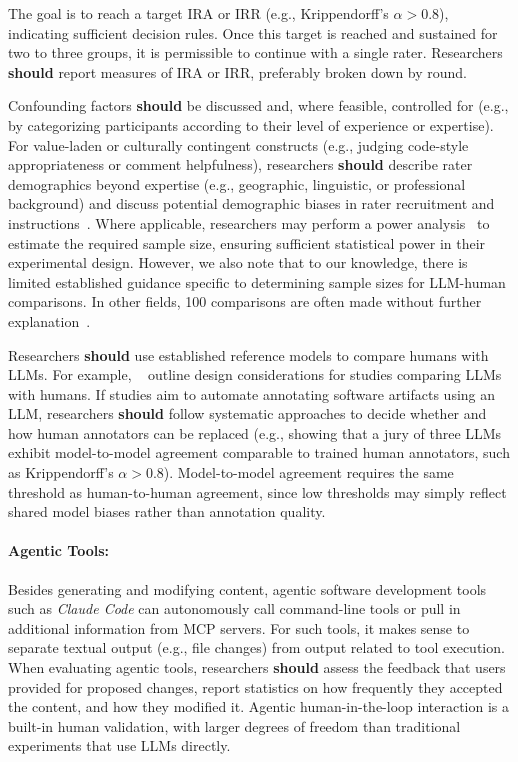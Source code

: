 \documentclass[smallextended]{svjour3}
\newcommand{\should}{\textbf{should}\xspace}
\begin{document}
The goal is to reach a target IRA or IRR (e.g., Krippendorff's $\alpha>0.8$), indicating sufficient decision rules. Once this target is reached and sustained for two to three groups, it is permissible to continue with a single rater.
Researchers \should report measures of IRA or IRR, preferably broken down by round.

Confounding factors \should be discussed and, where feasible, controlled for (e.g., by categorizing participants according to their level of experience or expertise).
For value-laden or culturally contingent constructs (e.g., judging code-style appropriateness or comment helpfulness), researchers \should describe rater demographics beyond expertise (e.g., geographic, linguistic, or professional background) and discuss potential demographic biases in rater recruitment and instructions~\cite{bean2025measuring}.
Where applicable, researchers may perform a power analysis~\cite{Cohen1992,DBLP:journals/infsof/DybaKS06} to estimate the required sample size, ensuring sufficient statistical power in their experimental design.
However, we also note that to our knowledge, there is limited established guidance specific to determining sample sizes for LLM-human comparisons. In other fields, 100 comparisons are often made without further explanation~\cite{DBLP:journals/npjdm/TamSKSPMOWVFMCSPW24}.

Researchers \should use established reference models to compare humans with LLMs.
For example, \citeauthor{DBLP:conf/icse/SchneiderFW25}~\cite{DBLP:conf/icse/SchneiderFW25} outline design considerations for studies comparing LLMs with humans.
If studies aim to automate annotating software artifacts using an LLM, researchers \should follow systematic approaches to decide whether and how human annotators can be replaced (e.g., showing that a jury of three LLMs exhibit model-to-model agreement comparable to trained human annotators, such as Krippendorff's $\alpha>0.8$). Model-to-model agreement requires the same threshold as human-to-human agreement, since low thresholds may simply reflect shared model biases rather than annotation quality.

\paragraph{Agentic Tools:}
Besides generating and modifying content, agentic software development tools such as \emph{Claude Code} can autonomously call command-line tools or pull in additional information from MCP servers.
For such tools, it makes sense to separate textual output (e.g., file changes) from output related to tool execution.
When evaluating agentic tools, researchers \should assess the feedback that users provided for proposed changes, report statistics on how frequently they accepted the content, and how they modified it.
Agentic human-in-the-loop interaction is a built-in human validation, with larger degrees of freedom than traditional experiments that use LLMs directly.
\end{document}

